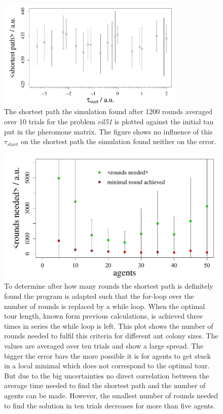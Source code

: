 \documentclass[11pt]{article}
\begin{document}
\begin{figure}[H]

	\centering
	\includegraphics[width=0.8\textwidth]{Plots/tauinit_vs_shortestpath.pdf}

\caption{The shortest path the simulation found after 1200 rounds averaged over 10 trials for the problem \textit{eil51} is plotted against the initial tau put in the pheromone matrix. The figure shows no influence of this $\tau_{start}$ on the shortest path the simulation found neither on the error.}
\label{fig:tauzushortestpath}
\end{figure}

\begin{figure}[h!]
\begin{center}
\includegraphics[width=0.9\linewidth]{rounds_needed_average_vs_shortestpath}
\caption{To determine after how many rounds the shortest path is definitely found the program is adapted such that the for-loop over the number of rounds is replaced by a while loop. When the optimal tour length, known form previous calculations, is achieved three times in series the while loop is left. This plot shows the number of rounds needed to fulfil this criteria for different ant colony sizes. The values are averaged over ten trials and show a large spread. The bigger the error bars the more possible it is for agents to get stuck in a local minimal which does not correspond to the optimal tour. But due to the big uncertainties no direct correlation between the average time needed to find the shortest path and the number of agents can be made. However, the smallest number of rounds needed to find the solution in ten trials decreases for more than five agents.}
\label{fig:speed}
\end{center}
\end{figure}
\end{document}
